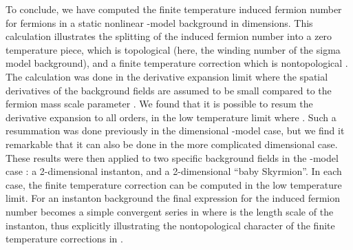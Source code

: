 \documentclass[a4paper,prd]{revtex4}
\begin{document}
To conclude, we have computed the finite temperature induced fermion number for
fermions in a static nonlinear \myHighlight{$\sigma$}\coordHE{}-model background in \coordHE{} dimensions. This
calculation illustrates the splitting of the induced fermion number into a
zero temperature piece, which is topological (here, the winding number of
the sigma model background), and a finite temperature correction which is
nontopological \cite{dr}. The calculation was done in the derivative
expansion limit where the spatial derivatives of the background fields
are assumed to be small compared to the fermion mass scale parameter \coordHE{}.
We found that it is possible to resum the derivative expansion to all
orders, in the low temperature limit where \coordHE{}. Such a resummation
was done previously \cite{ad} in the \coordHE{} dimensional \myHighlight{$\sigma$}\coordHE{}-model
case, but we find it remarkable that it can also be done in the more
complicated \coordHE{} dimensional case. These results were then applied to two
specific background fields in the \myHighlight{$\sigma$}\coordHE{}-model case : a 2-dimensional
\coordHE{} instanton, and a 2-dimensional ``baby Skyrmion''. In
each case, the finite temperature correction can be computed in the low
temperature limit. For an instanton background the final expression for
the induced fermion number
\coordHE{} becomes a simple convergent series in \coordHE{}
where \myHighlight{$\lambda$}\coordHE{} is the length scale of the instanton, thus explicitly illustrating the
nontopological character of the finite temperature corrections in \coordHE{}.  
\end{document}
